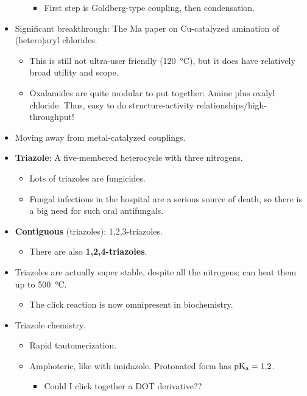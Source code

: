 \documentclass[../notes.tex]{subfiles}
\begin{document}
\begin{itemize}
\begin{itemize}
        \begin{itemize}
            \item First step is Goldberg-type coupling, then condensation.
        \end{itemize}
    \end{itemize}
    \item Significant breakthrough: The Ma paper on Cu-catalyzed amination of (hetero)aryl chlorides.
    \begin{itemize}
        \item This is still not ultra-user friendly (\SI{120}{\celsius}), but it does have relatively broad utility and scope.
        \item Oxalamides are quite modular to put together: Amine plus oxalyl chloride. Thus, easy to do structure-activity relationships/high-throughput!
    \end{itemize}
    \item Moving away from metal-catalyzed couplings.
    \item \textbf{Triazole}: A five-membered heterocycle with three nitrogens.
    \begin{itemize}
        \item Lots of triazoles are fungicides.
        \item Fungal infections in the hospital are a serious source of death, so there is a big need for such oral antifungals.
    \end{itemize}
    \item \textbf{Contiguous} (triazoles): 1,2,3-triazoles.
    \begin{itemize}
        \item There are also \textbf{1,2,4-triazoles}.
    \end{itemize}
    \item Triazoles are actually super stable, despite all the nitrogens; can heat them up to \SI{500}{\celsius}.
    \begin{itemize}
        \item The click reaction is now omnipresent in biochemistry.
    \end{itemize}
    \item Triazole chemistry.
    \begin{itemize}
        \item Rapid tautomerization.
        \item Amphoteric, like with imidazole. Protonated form has $\operatorname{\text{p}K_\text{a}}=1.2$.
        \begin{itemize}
            \item Could I click together a DOT derivative??

\end{itemize}
\end{itemize}
\end{itemize}
\end{document}
